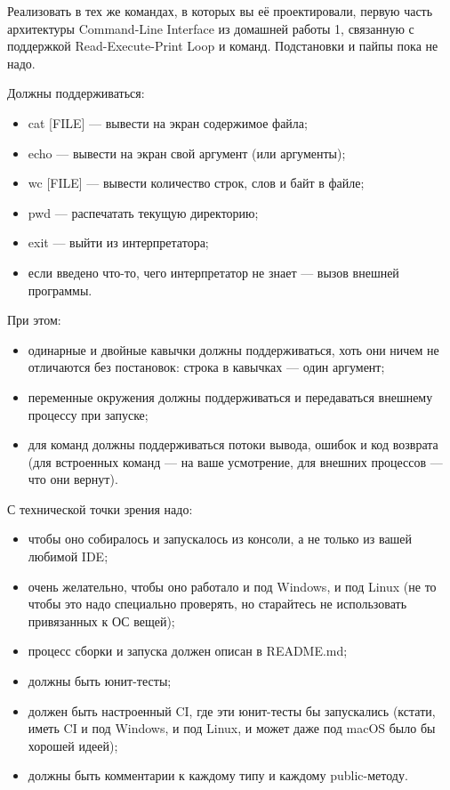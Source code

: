 \documentclass[a5paper]{homework}
\begin{document}

Реализовать в тех же командах, в которых вы её проектировали, первую часть архитектуры Command-Line Interface из домашней работы 1, связанную с поддержкой Read-Execute-Print Loop и команд. Подстановки и пайпы пока не надо.

Должны поддерживаться:

\begin{itemize}
    \item cat [FILE] --- вывести на экран содержимое файла;
    \item echo --- вывести на экран свой аргумент (или аргументы);
    \item wc [FILE] --- вывести количество строк, слов и байт в файле;
    \item pwd --- распечатать текущую директорию;
    \item exit --- выйти из интерпретатора;
    \item если введено что-то, чего интерпретатор не знает --- вызов внешней программы.
\end{itemize}

При этом:

\begin{itemize}
    \item одинарные и двойные кавычки должны поддерживаться, хоть они ничем не отличаются без постановок: строка в кавычках --- один аргумент;
    \item переменные окружения должны поддерживаться и передаваться внешнему процессу при запуске;
    \item для команд должны поддерживаться потоки вывода, ошибок и код возврата (для встроенных команд --- на ваше усмотрение, для внешних процессов --- что они вернут).
\end{itemize}

С технической точки зрения надо:

\begin{itemize}
    \item чтобы оно собиралось и запускалось из консоли, а не только из вашей любимой IDE;
    \item очень желательно, чтобы оно работало и под Windows, и под Linux (не то чтобы это надо специально проверять, но старайтесь не использовать привязанных к ОС вещей);
    \item процесс сборки и запуска должен описан в README.md;
    \item должны быть юнит-тесты;
    \item должен быть настроенный CI, где эти юнит-тесты бы запускались (кстати, иметь CI и под Windows, и под Linux, и может даже под macOS было бы хорошей идеей);
    \item должны быть комментарии к каждому типу и каждому public-методу.
\end{itemize}
\end{document}
